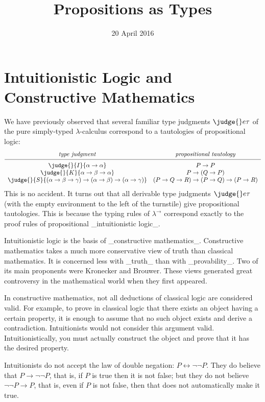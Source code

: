 \title{Propositions as Types}
\date{20 April 2016}
\maketitle

\section{Intuitionistic Logic and Constructive Mathematics}

We have previously observed that several familiar type judgments $\judge{}e\tau$ of the pure simply-typed $\lambda$-calculus correspond to a tautologies of propositional logic:
\[
\begin{array}{cc}
\mbox{\textit{type judgment}} & \mbox{\textit{propositional tautology}}\\[2pt]\hline\\[-8pt]
\judge{}{I}{\alpha\to\alpha} & P\to P\\
\judge{}{K}{\alpha\to\beta\to\alpha} & P\to (Q\to P)\\
\judge{}{S}{(\alpha\to\beta\to\gamma)\to(\alpha\to\beta)\to(\alpha\to\gamma)} & (P\to Q\to R)\to(P\to Q)\to(P\to R)\\
\end{array}
\]
This is no accident.  It turns out that all derivable type judgments $\judge{}e\tau$ (with the empty environment to the left of the turnstile) give propositional tautologies.  This is because the typing rules of $\lambda^\rightarrow$ correspond exactly to the proof rules of propositional _intuitionistic logic_.

Intuitionistic logic is the basis of _constructive mathematics_.  Constructive mathematics takes a much more conservative view of truth than classical mathematics.  It is concerned less with _truth_ than with _provability_.  Two of its main proponents were Kronecker and Brouwer.  These views generated great controversy in the mathematical world when they first appeared.

In constructive mathematics, not all deductions of classical logic are considered valid.  For example, to prove in classical logic that there exists an object having a certain property, it is enough to assume that no such object exists and derive a contradiction.  Intuitionists would not consider this argument valid.  Intuitionistically, you must actually construct the object and prove that it has the desired property.

Intuitionists do not accept the law of double negation: $P\leftrightarrow \neg\neg P$.  They do believe that $P\to\neg\neg P$, that is, if $P$ is true then it is not false; but they do not believe $\neg\neg P\to P$, that is, even if $P$ is not false, then that does not automatically make it true.

